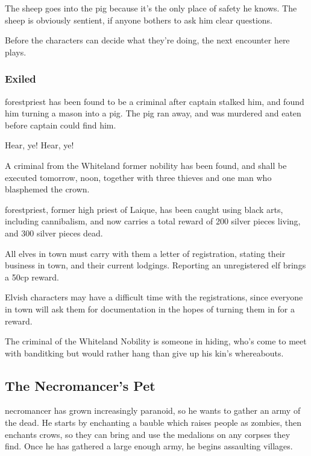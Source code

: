 The sheep goes into the \gls{pig} because it's the only place of safety he knows.  The sheep is obviously sentient, if anyone bothers to ask him clear questions.

Before the characters can decide what they're doing, the next encounter here plays.

\subsubsection{ Exiled}

\Gls{forestpriest} has been found to be a criminal after \gls{captain} stalked him, and found him turning a mason into a pig.  The pig ran away, and was murdered and eaten before \gls{captain} could find him.

\begin{speechtext}
	Hear, ye! Hear, ye!

	A criminal from the Whiteland former nobility has been found, and shall be executed tomorrow, noon, together with three thieves and one man who blasphemed the crown.

	\Gls{forestpriest}, former high priest of Laique, has been caught using black arts, including cannibalism, and now carries a total reward of 200 silver pieces living, and 300 silver pieces dead.

	All elves in town must carry with them a letter of registration, stating their business in town, and their current lodgings.  Reporting an unregistered elf brings a 50cp reward.

\end{speechtext}

Elvish characters may have a difficult time with the registrations, since everyone in town will ask them for documentation in the hopes of turning them in for a reward.

The criminal of the Whiteland Nobility is someone in hiding, who's come to meet with \gls{banditking} but would rather hang than give up his kin's whereabouts.

\subsection[The Necromancer's Pet]{The Necromancer's Pet}\label{necromancerspet}

\Gls{necromancer} has grown increasingly paranoid, so he wants to gather an army of the dead.  He starts by enchanting a bauble which raises people as zombies, then enchants crows, so they can bring and use the medalions on any corpses they find.  Once he has gathered a large enough army, he begins assaulting villages.

